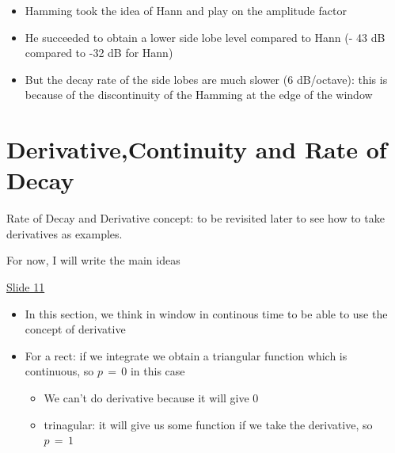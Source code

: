 \begin{itemize}
    \begin{itemize}
        \item Hamming took the idea of Hann and play on the amplitude factor
        
        \item He succeeded to obtain a lower side lobe level compared to Hann (- 43 dB compared to -32 dB for Hann)
        
        \item But the decay rate of the side lobes are much slower (6 dB/octave): this is because of the discontinuity of  the Hamming at the edge of the window
        
    \end{itemize}


\end{itemize}


\section{Derivative,Continuity and Rate of Decay}

 Rate of Decay and Derivative concept: to be revisited later to see how to take derivatives as examples.

For now, I will write the main ideas

\underline{Slide 11}

\begin{itemize}
    \item In this section, we think in window in continous time to be able to use the concept of derivative
    
    \item For a rect: if we integrate we obtain a triangular function which is continuous, so $p \, = \, 0$ in this case
    
        \begin{itemize}
            \item We can't do derivative because it will give 0 
            
            \item trinagular: it will give us some function if we take the derivative, so $p \, = \, 1$
        \end{itemize}
    
    
\end{itemize}